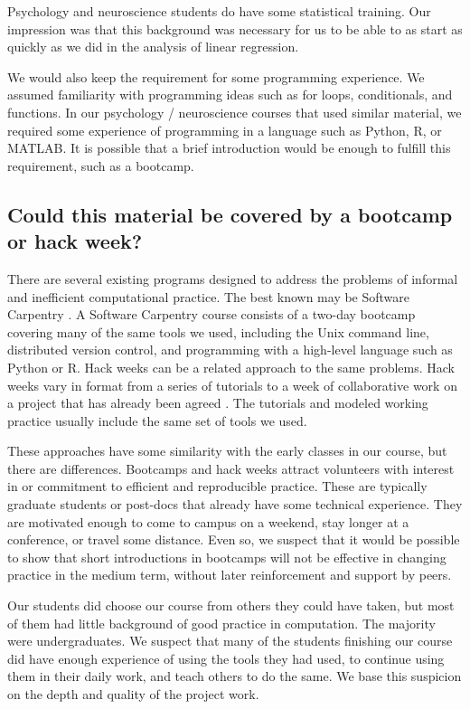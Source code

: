 Psychology and neuroscience students do have some statistical training.  Our
impression was that this background was necessary for us to be able to as
start as quickly as we did in the analysis of linear regression.

We would also keep the requirement for some programming experience. We assumed
familiarity with programming ideas such as for loops, conditionals, and
functions.  In our psychology / neuroscience courses that used similar
material, we required some experience of programming in a language such as
Python, R, or MATLAB.  It is possible that a brief introduction would be
enough to fulfill this requirement, such as a bootcamp.

\subsection{Could this material be covered by a bootcamp or hack week?}

There are several existing programs designed to address the problems
of informal and inefficient computational practice.  The best known may be
Software Carpentry \citep{wilson2014software}.  A Software Carpentry course
consists of a two-day bootcamp covering many of the same tools we used,
including the Unix command line, distributed version control, and programming
with a high-level language such as Python or R. Hack weeks can be a related
approach to the same problems. Hack weeks vary in format from a series of
tutorials to a week of collaborative work on a project that has already been
agreed \citep{huppenkothen_hack_2017}.  The tutorials and modeled working
practice usually include the same set of tools we used.

These approaches have some similarity with the early classes in our course,
but there are differences.  Bootcamps and hack weeks attract volunteers with
interest in or commitment to efficient and reproducible practice. These are
typically graduate students or post-docs that already have some technical
experience.  They are motivated enough to come to campus on a weekend,
stay longer at a conference, or travel some distance.  Even so, we suspect
that it would be possible to show that short introductions in
bootcamps will not be effective in changing practice in the medium term,
without later reinforcement and support by peers.

Our students did choose our course from others they could have taken, but most
of them had little background of good practice in computation.  The majority
were undergraduates.  We suspect that many of the students finishing our
course did have enough experience of using the tools they had used, to
continue using them in their daily work, and teach others to do the same.  We
base this suspicion on the depth and quality of the project work.

